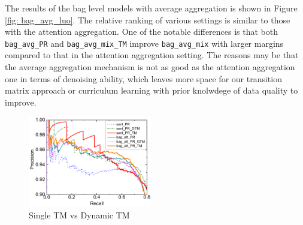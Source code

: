 The results of the bag level models with average aggregation is shown in Figure \ref{fig: bag_avg_luo}. The relative ranking of various settings is similar to those with the attention aggregation.
One of the notable differences is that both \texttt{bag\_avg\_PR} and \texttt{bag\_avg\_mix\_TM} improve \texttt{bag\_avg\_mix} with larger margins compared to that in the attention aggregation setting. The reasons may be that the average aggregation mechanism is not as good as the attention aggregation one in terms of denoising ability, which leaves more space for our transition matrix approach or curriculum learning with prior knolwdege of data quality to improve.

\begin{figure}[htbp]
\begin{center}
\includegraphics[width=0.48\textwidth]{figures/single_cmp_exp_overall.pdf}
\caption{Single TM vs Dynamic TM}
\label{fig: cmp_single_dynamic}
\end{center}
\end{figure}

